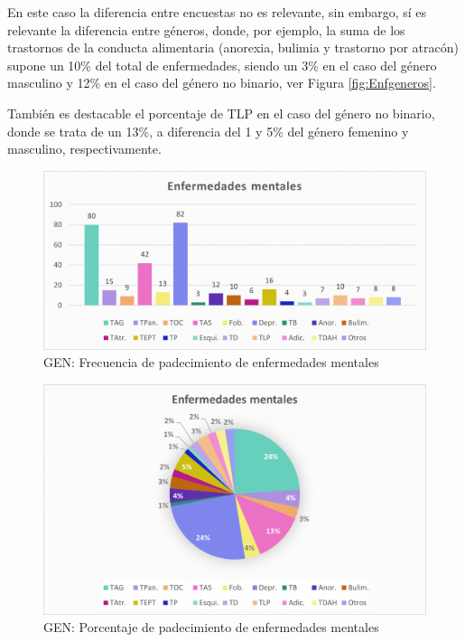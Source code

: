 \documentclass[12pt, a4paper,twoside,titlepage]{book}
\begin{document}
En este caso la diferencia entre encuestas no es relevante, sin embargo, sí es relevante la diferencia entre géneros, donde, por ejemplo, la suma de los trastornos de la conducta alimentaria (anorexia, bulimia y trastorno por atracón) supone un 10\% del total de enfermedades, siendo un 3\% en el caso del género masculino y 12\% en el caso del género no binario, ver Figura \ref{fig:Enfgeneros}.

También es destacable el porcentaje de TLP en el caso del género no binario, donde se trata de un 13\%, a diferencia del 1 y 5\% del género femenino y masculino, respectivamente. 



\begin{figure}
\centering
 \includegraphics[width=.9\linewidth]{Imagenes Form GEN/21GENEnf}
 \caption{GEN: Frecuencia de padecimiento de enfermedades mentales}
 \label{fig:Frecenf}
 \end{figure}

\begin{figure}
\centering
 \includegraphics[width=.9\linewidth]{Imagenes Form GEN/22GENEnf} 
 \caption{GEN: Porcentaje de padecimiento de enfermedades mentales}
 \label{fig:Porenf}
 \end{figure}
 
 
\end{document}
